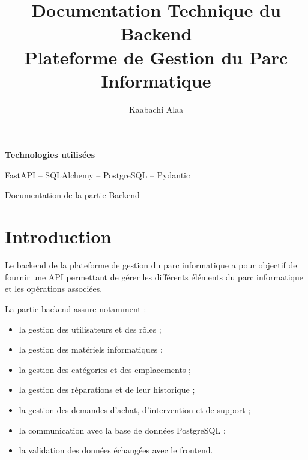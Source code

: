 \documentclass[12pt,a4paper]{report}
\title{
    \textbf{Documentation Technique du Backend}\\[0.5cm]
    \Large Plateforme de Gestion du Parc Informatique
}
\author{
Kaabachi Alaa
}
\begin{document}

\maketitle

\begin{center}
    \vfill

    \textbf{Technologies utilisées}

    \vspace{0.3cm}

    FastAPI -- SQLAlchemy -- PostgreSQL -- Pydantic

    \vfill

    Documentation de la partie Backend
\end{center}

\thispagestyle{empty}

\newpage


\tableofcontents

\newpage


\chapter{Introduction}

Le backend de la plateforme de gestion du parc informatique a pour objectif
de fournir une API permettant de gérer les différents éléments du parc
informatique et les opérations associées.

La partie backend assure notamment :

\begin{itemize}
    \item la gestion des utilisateurs et des rôles ;
    \item la gestion des matériels informatiques ;
    \item la gestion des catégories et des emplacements ;
    \item la gestion des réparations et de leur historique ;
    \item la gestion des demandes d'achat, d'intervention et de support ;
    \item la communication avec la base de données PostgreSQL ;
    \item la validation des données échangées avec le frontend.
\end{itemize}
\end{document}

